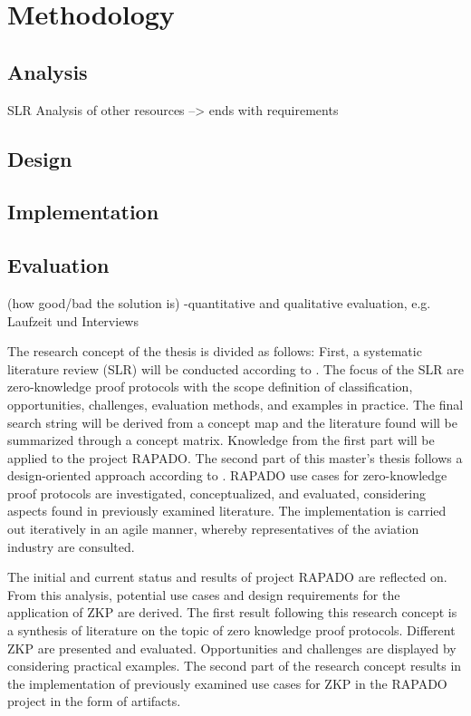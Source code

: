 \chapter{Methodology}
\section{Analysis}
SLR
Analysis of other resources
--> ends with requirements
\section{Design}
\section{Implementation}
\section{Evaluation}
(how good/bad the solution is)
-quantitative and qualitative evaluation, e.g. Laufzeit und Interviews

The research concept of the thesis is divided as follows: First, a systematic literature review (SLR) will be conducted according to \cite{HevnerAR2004DSiI, vomBrockeJan2019TDgs, Webster2002AnalyzingTP}. The focus of the SLR are zero-knowledge proof protocols with the scope definition of classification, opportunities, challenges, evaluation methods, and examples in practice. The final search string will be derived from a concept map and the literature found will be summarized through a concept matrix. Knowledge from the first part will be applied to the project RAPADO. The second part of this master's thesis follows a design-oriented approach according to \citet{HevnerAR2004DSiI, PeffersKen2007ADSR}. RAPADO use cases for zero-knowledge proof protocols are investigated, conceptualized, and evaluated, considering aspects found in previously examined literature. The implementation is carried out iteratively in an agile manner, whereby representatives of the aviation industry are consulted.

The initial and current status and results of project RAPADO are reflected on. From this analysis, potential use cases and design requirements for the application of ZKP are derived. The first result following this research concept is a synthesis of literature on the topic of zero knowledge proof protocols. Different ZKP are presented and evaluated. Opportunities and challenges are displayed by considering practical examples. The second part of the research concept results in the implementation of previously examined use cases for ZKP in the RAPADO project in the form of artifacts.


